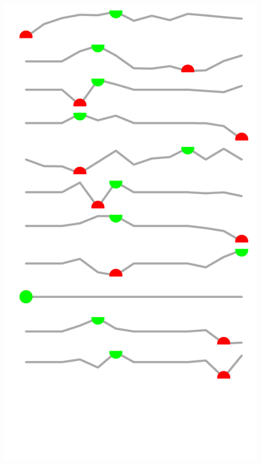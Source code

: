 \documentclass{article}\usepackage[]{graphicx}\usepackage[]{color}
\makeatletter
\def\maxwidth{ %
  \ifdim\Gin@nat@width>\linewidth
    \linewidth
  \else
    \Gin@nat@width
  \fi
}
\makeatother
\begin{document}
\begin{minipage}[c]{0.11\textwidth}
  \vspace*{+1.5cm}


{\centering \includegraphics[width=\maxwidth]{figure/sparklines_Culture-1} 

}



  \vspace*{-0.5cm}
\end{minipage}
    
\end{document}
